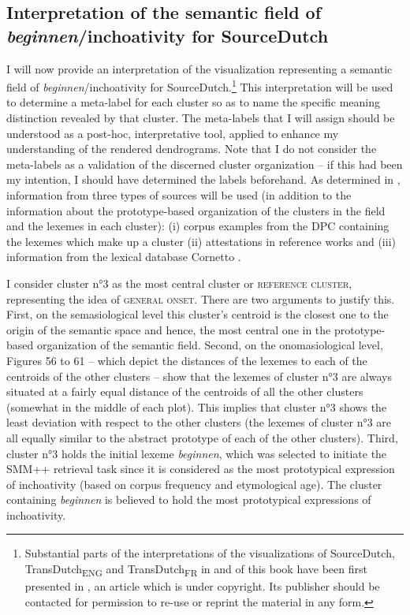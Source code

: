 \subsection{Interpretation of the semantic field of \textit{beginnen}\slash inchoativity for SourceDutch}
\label{sec:4.2.4}  
I will now provide an interpretation of the visualization representing a semantic field of \textit{beginnen}/inchoativity for SourceDutch.\footnote{Substantial parts of the interpretations of the visualizations of SourceDutch, TransDutch\textsubscript{ENG} and TransDutch\textsubscript{FR} in   and  of this book have been first presented in \citep{vandevoorde_corpus-based_2017}, an article which is under copyright. Its publisher should be contacted for permission to re-use or reprint the material in any form.} This interpretation will be used to determine a meta-label for each cluster so as to name the specific meaning distinction revealed by that cluster. The meta-labels that I will assign should be understood as a post-hoc, interpretative tool, applied to enhance my understanding of the rendered dendrograms. Note that I do not consider the meta-labels as a validation of the discerned cluster organization – if this had been my intention, I should have determined the labels beforehand. As determined in , information from three types of sources will be used (in addition to the information about the prototype-based organization of the clusters in the field and the lexemes in each cluster): (i) corpus examples from the DPC containing the lexemes which make up a cluster (ii) attestations in reference works and (iii) information from the lexical database Cornetto \citep{vossen_cornetto_2008, spyns_cornetto:_2013}. 

I consider cluster n°3 as the most central cluster or \textsc{reference cluster}, representing the idea of \textsc{general onset}. There are two arguments to justify this. First, on the semasiological level this cluster’s centroid is the closest one to the origin of the semantic space and hence, the most central one in the prototype-based organization of the semantic field. Second, on the onomasiological level, Figures 56 to 61 – which depict the distances of the lexemes to each of the centroids of the other clusters – show that the lexemes of cluster n°3 are always situated at a fairly equal distance of the centroids of all the other clusters (somewhat in the middle of each plot). This implies that cluster n°3 shows the least deviation with respect to the other clusters (the lexemes of cluster n°3 are all equally similar to the abstract prototype of each of the other clusters). Third, cluster n°3 holds the initial lexeme \textit{beginnen}, which was selected to initiate the SMM++ retrieval task since it is considered as the most prototypical expression of inchoativity (based on corpus frequency and etymological age). The cluster containing \textit{beginnen} is believed to hold the most prototypical expressions of inchoativity.

